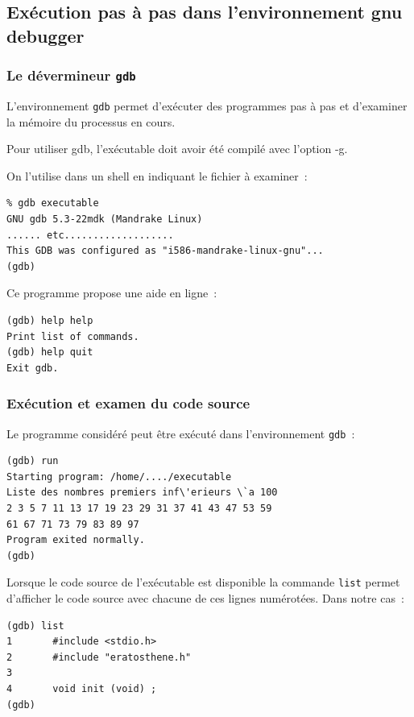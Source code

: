\begin{frame}[fragile]
  \section{Ex\'ecution pas \`a pas dans l'environnement gnu debugger}%
\frametitle{Le d\'evermineur \texttt{gdb}}%
L'environnement \texttt{gdb} permet d'ex\'ecuter des programmes pas
\`a pas   et d'examiner  la   m\'emoire du processus en cours.

Pour utiliser gdb, l'ex\'ecutable doit avoir \'et\'e compil\'e avec l'option -g.

On l'utilise dans un shell en 
indiquant le fichier \`a examiner~:
\begin{verbatim}
% gdb executable
GNU gdb 5.3-22mdk (Mandrake Linux)
...... etc...................
This GDB was configured as "i586-mandrake-linux-gnu"...
(gdb) 
\end{verbatim}
Ce programme propose une aide en ligne~:
\begin{verbatim}
(gdb) help help
Print list of commands.
(gdb) help quit
Exit gdb.
\end{verbatim}
\end{frame}
\begin{frame}[fragile]
  \frametitle{Ex\'ecution et examen du code source}%
Le programme consid\'er\'e peut \^etre ex\'ecut\'e dans l'environnement
\texttt{gdb}~:
\begin{verbatim}
(gdb) run
Starting program: /home/..../executable 
Liste des nombres premiers inf\'erieurs \`a 100
2 3 5 7 11 13 17 19 23 29 31 37 41 43 47 53 59 
61 67 71 73 79 83 89 97 
Program exited normally.
(gdb) 
\end{verbatim}
Lorsque le code source de l'ex\'ecutable est disponible la commande
\texttt{list} permet d'afficher le code source avec chacune de ces
lignes num\'erot\'ees. Dans notre cas~:
\begin{verbatim}
(gdb) list
1       #include <stdio.h>
2       #include "eratosthene.h"
3       
4       void init (void) ;
(gdb) 
\end{verbatim}
\end{frame}
